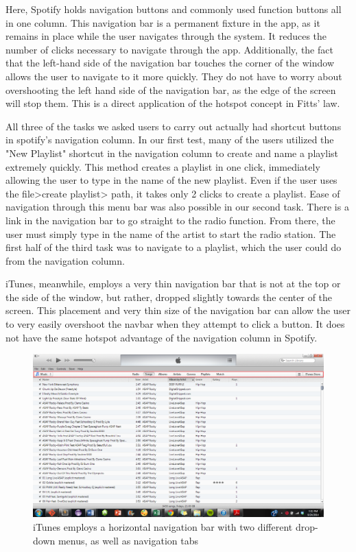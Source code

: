 \documentclass[12pt]{report}
\begin{document}
Here, Spotify holds navigation buttons and commonly used function buttons all in one column. This navigation bar is a permanent fixture in the app, as it remains in place while the user navigates through the system. It reduces the number of clicks necessary to navigate through the app. Additionally, the fact that the left-hand side of the navigation bar touches the corner of the window allows the user to navigate to it more quickly. They do not have to worry about overshooting the left hand side of the navigation bar, as the edge of the screen will stop them. This is a direct application of the hotspot concept in Fitts' law.

 All three of the tasks we asked users to carry out actually had shortcut buttons in spotify's navigation column. In our first test, many of the users utilized the "New Playlist" shortcut in the navigation column to create and name a playlist extremely quickly. This method creates a playlist in one click, immediately allowing the user to type in the name of the new playlist. Even if the user uses the file>create playlist> path, it takes only 2 clicks to create a playlist. Ease of navigation through this menu bar was also possible in our second task. There is a link in the navigation bar to go straight to the radio function. From there, the user must simply type in the name of the artist to start the radio station. The first half of the third task was to navigate to a playlist, which the user could do from the navigation column.

iTunes, meanwhile, employs a very thin navigation bar that is not at the top or the side of the window, but rather, dropped slightly towards the center of the screen. This placement and very thin size of the navigation bar can allow the user to very easily overshoot the navbar when they attempt to click a button. It does not have the same hotspot advantage of the navigation column in Spotify.

\begin{figure}[H]
	\centering
	\includegraphics[width=\textwidth]{chart5.png}
	\caption{iTunes employs a horizontal navigation bar with two different drop-down menus, as well as navigation tabs}
\end{figure}
\end{document}
